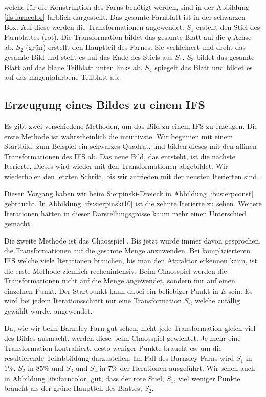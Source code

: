 welche für die Konstruktion des Farns benötigt werden, sind in der Abbildung \ref{ifs:farncolor} farblich dargestellt.
Das gesamte Farnblatt ist in der schwarzen Box.
Auf diese werden die Transformationen angewendet.
$S_1$ erstellt den Stiel des Farnblattes (rot).
Die Transformation bildet das gesamte Blatt auf die $y$-Achse ab.
$S_2$ (grün) erstellt den Hauptteil des Farnes. 
Sie verkleinert und dreht das gesamte Bild und stellt es auf das Ende des Stiels aus $S_1$.
$S_3$ bildet das gesamte Blatt auf das blaue Teilblatt unten links ab.
$S_4$ spiegelt das Blatt und bildet es auf das magentafarbene Teilblatt ab.  
\subsection{Erzeugung eines Bildes zu einem IFS}
Es gibt zwei verschiedene Methoden, um das Bild zu einem IFS zu erzeugen.
Die erste Methode ist wahrscheinlich die intuitivste. 
Wir beginnen mit einem Startbild, zum Beispiel ein schwarzes Quadrat, und bilden dieses mit den affinen Transformationen des IFS ab.
Das neue Bild, das entsteht, ist die nächste Iterierte.
Dieses wird wieder mit den Transformationen abgebildet.
Wir wiederholen den letzten Schritt, bis wir zufrieden mit der neusten Iterierten sind.

Diesen Vorgang haben wir beim Sierpinski-Dreieck in Abbildung \ref{ifs:sierpconst} gebraucht.
In Abbildung \ref{ifs:sierpinski10} ist die zehnte Iterierte zu sehen.
Weitere Iterationen hätten in dieser Darstellungsgrösse kaum mehr einen Unterschied gemacht.


Die zweite Methode ist das Chaosspiel \cite{ifs:chaos}. 
Bis jetzt wurde immer davon gesprochen, die Transformationen auf die gesamte Menge anzuwenden.
Bei komplizierteren IFS welche viele Iterationen brauchen, bis man den Attraktor erkennen kann, ist die erste Methode ziemlich rechenintensiv.
Beim Chaosspiel werden die Transformationen nicht auf die Menge angewendet, sondern nur auf einen einzelnen Punkt.
Der Startpunkt kann dabei ein beliebiger Punkt in $E$ sein.
Es wird bei jedem Iterationsschritt nur eine Transformation $S_i$, welche zufällig gewählt wurde, angewendet.

Da, wie wir beim Barnsley-Farn gut sehen, nicht jede Transformation gleich viel des Bildes ausmacht, werden diese beim Chaosspiel gewichtet.
Je mehr eine Transformation kontrahiert, desto weniger Punkte braucht es, um die resultierende Teilabbildung darzustellen.
Im Fall des Barnsley-Farns wird $S_1$ in $1\%$, $S_2$ in $85\%$ und $S_3$ und $S_4$ in $7\%$ der Iterationen ausgeführt.
Wir sehen auch in Abbildung \ref{ifs:farncolor} gut, dass der rote Stiel, $S_1$, viel weniger Punkte braucht als der grüne Hauptteil des Blattes, $S_2$.

